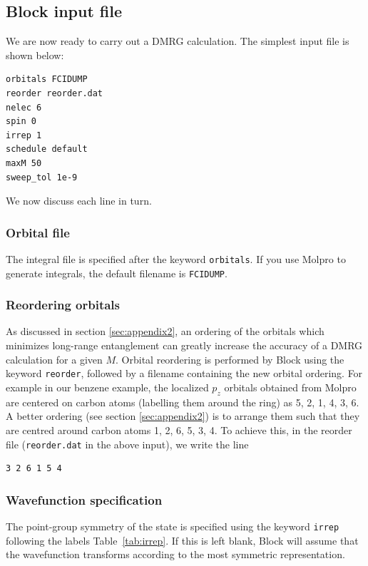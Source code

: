 \documentclass[letterpaper,12pt,aps, pra]{revtex4-1}
\begin{document}
\subsection{Block input file}

We are now ready to carry out a DMRG calculation. The simplest input file is shown below:

\begin{verbatim}
orbitals FCIDUMP
reorder reorder.dat
nelec 6 
spin 0
irrep 1
schedule default
maxM 50
sweep_tol 1e-9
\end{verbatim}

We now discuss each line in turn.

\subsubsection{Orbital file}
The integral file is specified after the keyword \texttt{orbitals}. 
If you use Molpro to generate integrals, the default filename is \texttt{FCIDUMP}.

\subsubsection{Reordering orbitals}

As discussed in section \ref{sec:appendix2}, an ordering of the orbitals which minimizes long-range
entanglement can greatly increase the accuracy
of a DMRG calculation for a given $M$. Orbital reordering is
performed by Block using the keyword \texttt{reorder},
followed by a filename containing the new orbital ordering.
For example in our benzene example, the localized $p_z$ orbitals obtained from Molpro are centered on carbon atoms 
(labelling them around the ring) as 5, 2, 1, 4, 3, 6. A better ordering  (see section \ref{sec:appendix2}) is to
arrange them such that they are centred around carbon atoms 1, 2, 6, 5, 3, 4. 
To achieve this, in the reorder file (\texttt{reorder.dat} in the above input), we write the line
\begin{verbatim}
3 2 6 1 5 4
\end{verbatim}


\subsubsection{Wavefunction specification}

The point-group symmetry of the state is specified using the keyword \texttt{irrep} following the labels Table~\ref{tab:irrep}.
If this is left blank, Block will assume that the wavefunction transforms according to the most symmetric representation.
\end{document}
